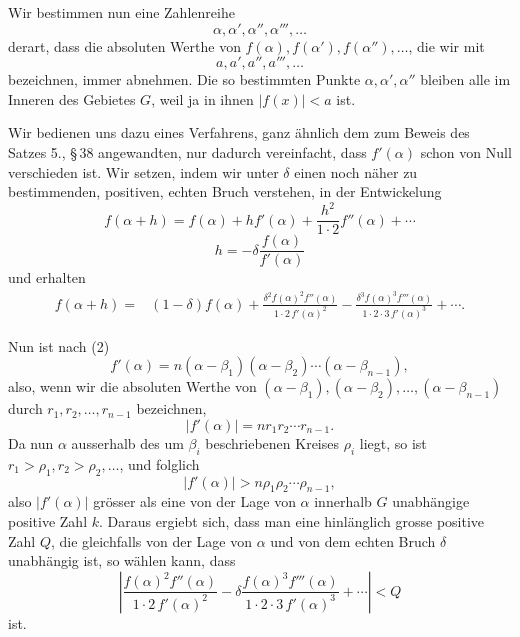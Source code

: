 \documentclass[11pt]{article}
\begin{document}
Wir bestimmen nun eine Zahlenreihe
\[
 \alpha,\alpha',\alpha'',\alpha''',\ldots
\]
derart, dass die absoluten Werthe von $f(\alpha),f(\alpha'),f(\alpha''),\ldots$, die wir mit
\[
 a,a',a'',a''',\ldots
\]
bezeichnen, immer abnehmen. Die so bestimmten Punkte $\alpha,\alpha',\alpha''$ bleiben alle im Inneren des Gebietes $G$, weil ja in ihnen $|f(x)|<a$ ist.

Wir bedienen uns dazu eines Verfahrens, ganz ähnlich dem zum Beweis des Satzes 5., \S\,38 angewandten, nur dadurch vereinfacht, dass $f'(\alpha)$ schon von Null verschieden ist. Wir setzen, indem wir unter $\delta$ einen noch näher zu bestimmenden, positiven, echten Bruch verstehen, in der Entwickelung
\begin{equation}
 f(\alpha+h)=f(\alpha)+h f'(\alpha)+\frac{h^2}{1\cdot2}f''(\alpha)+\cdots
\tag{6}
\end{equation}
\begin{equation}
 h=-\delta\frac{f(\alpha)}{f'(\alpha)}
\tag{7}
\end{equation}
und erhalten
\begin{align}
 f(\alpha+h)={}&(1-\delta)f(\alpha)
 +\frac{\delta^2 f(\alpha)^2 f''(\alpha)}{1\cdot2\,f'(\alpha)^2}
 -\frac{\delta^3 f(\alpha)^3 f'''(\alpha)}{1\cdot2\cdot3\,f'(\alpha)^3}+\cdots .
\tag{8}
\end{align}

Nun ist nach (2)
\[
 f'(\alpha)=n(\alpha-\beta_1)(\alpha-\beta_2)\cdots(\alpha-\beta_{n-1}),
\]
also, wenn wir die absoluten Werthe von $(\alpha-\beta_1),(\alpha-\beta_2),\ldots,(\alpha-\beta_{n-1})$ durch $r_1,r_2,
\ldots,r_{n-1}$ bezeichnen,
\[
 |f'(\alpha)|=nr_1r_2\cdots r_{n-1}.
\]
Da nun $\alpha$ ausserhalb des um $\beta_i$ beschriebenen Kreises $\rho_i$ liegt, so ist $r_1>\rho_1,r_2>\rho_2,
\ldots$, und folglich
\[
 |f'(\alpha)|>n\rho_1\rho_2\cdots\rho_{n-1},
\]
also $|f'(\alpha)|$ grösser als eine von der Lage von $\alpha$ innerhalb $G$ unabhängige positive Zahl $k$. Daraus ergiebt sich, dass man eine hinlänglich grosse positive Zahl $Q$, die gleichfalls von der Lage von $\alpha$ und von dem echten Bruch $\delta$ unabhängig ist, so wählen kann, dass
\begin{equation}
 \left|\frac{f(\alpha)^2f''(\alpha)}{1\cdot2\,f'(\alpha)^2}
 -\delta\frac{f(\alpha)^3f'''(\alpha)}{1\cdot2\cdot3\,f'(\alpha)^3}+\cdots\right|<Q
\tag{9}
\end{equation}
ist.
\end{document}

